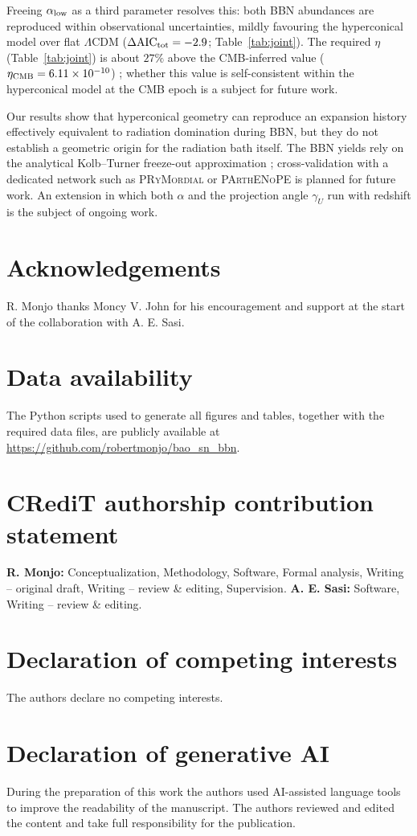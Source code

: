 ﻿\documentclass[3p,twocolumn]{elsarticle}
\begin{document}
Freeing $\alpha_{\rm low}$ as a third parameter resolves this: both BBN abundances are reproduced within observational uncertainties, mildly favouring the hyperconical model over flat $\Lambda$CDM ($\Delta\mathrm{AIC}_{\rm tot}=-2.9$; Table~\ref{tab:joint}). The required $\eta$ (Table~\ref{tab:joint}) is about $27\%$ above the CMB-inferred value ($\eta_{\rm CMB}=6.11\times10^{-10}$) \cite{fields2020bbn,schoneberg2024bbn}; whether this value is self-consistent within the hyperconical model at the CMB epoch is a subject for future work. 

Our results show that hyperconical geometry can reproduce an expansion history effectively equivalent to radiation domination during BBN, but they do not establish a geometric origin for the radiation bath itself. The BBN yields rely on the analytical Kolb--Turner freeze-out approximation \cite{kolbturner1990}; cross-validation with a dedicated network such as \textsc{PRyMordial} \cite{burns2024prymoridal} or \textsc{PArthENoPE} \cite{consiglio2018parthenope} is planned for future work. An extension in which both $\alpha$ and the projection angle $\gamma_U$ run with redshift is the subject of ongoing work.


\section*{Acknowledgements}
R. Monjo thanks Moncy V. John for his encouragement and support at the start of the collaboration with A. E. Sasi.

\section*{Data availability}

The Python scripts used to generate all figures and tables, together with the required data files, are publicly available at \url{https://github.com/robertmonjo/bao_sn_bbn}.

\section*{CRediT authorship contribution statement}
\textbf{R. Monjo:} Conceptualization, Methodology, Software, Formal analysis, Writing -- original draft, Writing -- review \& editing, Supervision. \textbf{A. E. Sasi:} Software, Writing -- review \& editing.

\section*{Declaration of competing interests}
The authors declare no competing interests.

\section*{Declaration of generative AI}
During the preparation of this work the authors used AI-assisted language tools to improve the readability of the manuscript. The authors reviewed and edited the content and take full responsibility for the publication.



\end{document}
